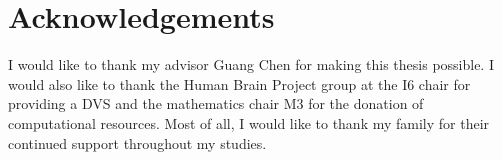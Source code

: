\chapter{Acknowledgements}

I would like to thank my advisor Guang Chen for making this thesis possible. I
would also like to thank the Human Brain Project group at the I6 chair for
providing a DVS and the mathematics chair M3 for the donation of computational
resources. Most of all, I would like to thank my family for their continued
support throughout my studies.
